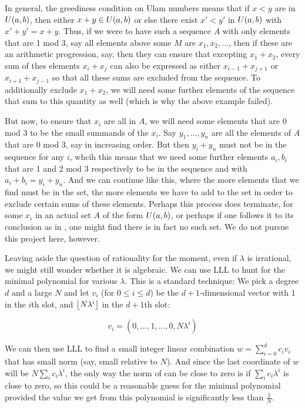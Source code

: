 \documentclass{report}
\theoremstyle{remark}
\numberwithin{equation}{section}
\begin{document}
In general, the greediness condition on Ulam numbers means that if
$x < y$ are in $U(a,b)$, then either $x+y \in U(a,b)$ or
else there exist $x' < y'$ in $U(a,b)$ with $x'+y' = x+y$.  Thus,
if we were to have such a sequence $A$ with only elements that are 1
mod 3, say all elements above some $M$ are $x_1, x_2, \ldots$, then if
these are an arithmetic progression, say, then they can ensure that
excepting $x_1 + x_2$, every sum of thes elements $x_i + x_j$ can also
be expressed as either $x_{i-1} + x_{j+1}$ or $x_{i+1}+x_{j-1}$ so
that all these sums are excluded from the sequence.  To additionally
exclude $x_1 + x_2$, we will need some further elements of the
sequence that sum to this quantity as well (which is why the above
example failed).

But now, to ensure that $x_i$ are all in $A$, we will need some
elements that are 0 mod 3 to be the small summands of the $x_i$.  Say
$y_1, \ldots, y_n$ are all the elements of $A$ that are 0 mod 3, say
in increasing order.  But then $y_i + y_n$ must not be in the sequence
for any $i$, whcih this means that we need some further elements
$a_i, b_i$ that are 1 and 2 mod 3 respectively to be in the sequence
and with $a_i+b_i = y_i + y_n$.  And we can continue like this, where
the more elements that we find must be in the set, the more elements
we have to add to the set in order to exclude certain sums of these
elements.  Perhaps this process does terminate, for some $x_i$ in an
actual set $A$ of the form $U(a,b)$, or perhaps if one follows it
to its conclusion as in \cite{schmerl:jct1994}, one might find
there is in fact no such set.  We do not pursue this project here,
however.  

Leaving aside the question of rationality for the moment, even if
$\lambda$ is irrational, we might still wonder whether it is
algebraic.  We can use LLL to hunt for the minimal polynomial for
various $\lambda$.  This is a standard technique: We pick a degree $d$
and a large $N$ and let $v_i$ (for $0 \leq i \leq d$) be the
$d+1$-dimensional vector with $1$ in the $i$th slot, and
$\left\lfloor N\lambda^i \right\rfloor$ in the $d+1$th slot:

\[v_i = \left(0, \ldots, 1, \ldots, 0, N\lambda^i\right)\]

We can then use LLL to find a small integer linear combination
$w = \sum_{i=0}^d c_i v_i$ that has small norm (say, small relative to
$N$).  And since the last coordinate of $w$ will be
$N \sum_i c_i \lambda^i$, the only way the norm of can be close to
zero is if $\sum_i c_i \lambda^i$ is close to zero, so this could be a
reasonable guess for the minimal polynomial provided the value we get
from this polynomial is significantly less than $\frac{1}{N}$.  
\end{document}
